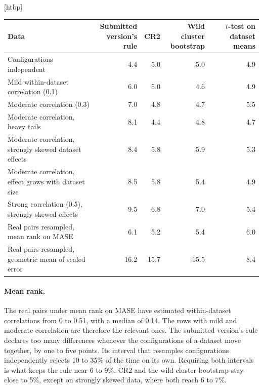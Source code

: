 \documentclass{article}
\makeatletter
\renewenvironment{table}
  {\setlength{\abovecaptionskip}{6\p@}%
   \setlength{\belowcaptionskip}{\z@}%
   \@float{table}}
  {\end@float}
\makeatother
\begin{document}
\begin{table}[htbp]
\centering
\small
\begin{tabular}{@{}p{6.6cm}rrrr@{}}
\toprule
Data & \shortstack[r]{Submitted\\version's rule} & CR2 & \shortstack[r]{Wild cluster\\bootstrap}
& \shortstack[r]{$t$-test on\\dataset means} \\
\midrule
Configurations independent & 4.4 & 5.0 & 5.0 & 4.9 \\
Mild within-dataset correlation (0.1) & 6.0 & 5.0 & 4.6 & 4.9 \\
Moderate correlation (0.3) & 7.0 & 4.8 & 4.7 & 5.5 \\
Moderate correlation, heavy tails & 8.1 & 4.4 & 4.8 & 4.7 \\
Moderate correlation, strongly skewed dataset effects & 8.4 & 5.8 & 5.9 & 5.3 \\
Moderate correlation, effect grows with dataset size & 8.5 & 5.8 & 5.4 & 4.9 \\
Strong correlation (0.5), strongly skewed effects & 9.5 & 6.8 & 7.0 & 5.4 \\
\addlinespace
Real pairs resampled, mean rank on MASE & 6.1 & 5.2 & 5.4 & 6.0 \\
Real pairs resampled, geometric mean of scaled error & 16.2 & 15.7 & 15.5 & 8.4 \\
\bottomrule
\end{tabular}
\caption{Rate (\%) at which each method declares a difference that does not exist, at the
5\% level. Simulated rows use GIFT-Eval's layout and 4{,}000 boards each. The last two rows
resample the 28 real datasets 1{,}000 times for each of the 45 top-ten pairs and pool the
pairs. The $t$-test on dataset means weights datasets equally, so it answers a slightly
different question.}
\label{tab:calib}
\end{table}

\paragraph{Mean rank.} The real pairs under mean rank on MASE have estimated within-dataset
correlations from 0 to 0.51, with a median of 0.14. The rows with mild and moderate
correlation are therefore the relevant ones. The submitted version's rule declares too many
differences whenever the configurations of a dataset move together, by one to five points. Its
interval that resamples configurations independently rejects 10 to 35\% of the time on its
own. Requiring both intervals is what keeps the rule near 6 to 9\%. CR2 and the wild cluster
bootstrap stay close to 5\%, except on strongly skewed data, where both reach 6 to 7\%.
\end{document}
